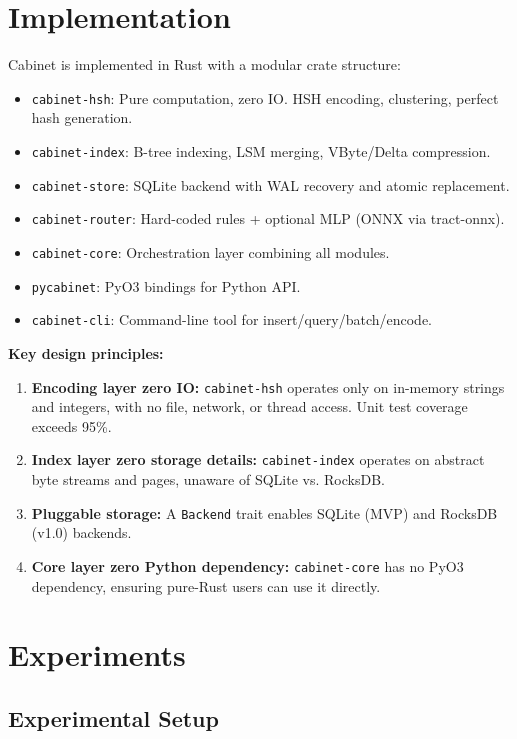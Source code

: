 \documentclass[11pt,a4paper]{article}
\theoremstyle{definition}
\begin{document}
\section{Implementation}
\label{sec:impl}

Cabinet is implemented in Rust with a modular crate structure:

\begin{itemize}
    \item \texttt{cabinet-hsh}: Pure computation, zero IO. HSH encoding, clustering, perfect hash generation.
    \item \texttt{cabinet-index}: B-tree indexing, LSM merging, VByte/Delta compression.
    \item \texttt{cabinet-store}: SQLite backend with WAL recovery and atomic replacement.
    \item \texttt{cabinet-router}: Hard-coded rules + optional MLP (ONNX via tract-onnx).
    \item \texttt{cabinet-core}: Orchestration layer combining all modules.
    \item \texttt{pycabinet}: PyO3 bindings for Python API.
    \item \texttt{cabinet-cli}: Command-line tool for insert/query/batch/encode.
\end{itemize}

\textbf{Key design principles:}
\begin{enumerate}
    \item \textbf{Encoding layer zero IO:} \texttt{cabinet-hsh} operates only on in-memory strings and integers, with no file, network, or thread access. Unit test coverage exceeds 95\%.
    \item \textbf{Index layer zero storage details:} \texttt{cabinet-index} operates on abstract byte streams and pages, unaware of SQLite vs. RocksDB.
    \item \textbf{Pluggable storage:} A \texttt{Backend} trait enables SQLite (MVP) and RocksDB (v1.0) backends.
    \item \textbf{Core layer zero Python dependency:} \texttt{cabinet-core} has no PyO3 dependency, ensuring pure-Rust users can use it directly.
\end{enumerate}

\section{Experiments}
\label{sec:experiments}

\subsection{Experimental Setup}
\end{document}
